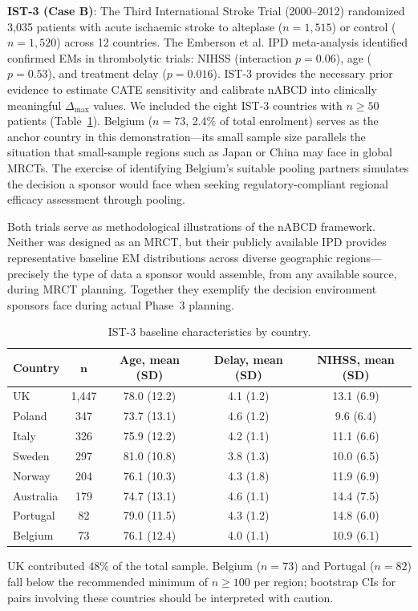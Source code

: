 \documentclass[AMA,Times1COL]{WileyNJDv5}
\begin{document}
\noindent
\textbf{IST-3 (Case B)}: The Third International Stroke Trial (2000--2012) randomized 3{,}035 patients with acute ischaemic stroke to alteplase ($n = 1{,}515$) or control ($n = 1{,}520$) across 12 countries.\cite{ist3_2012} The Emberson et al.\cite{emberson2014} IPD meta-analysis identified confirmed EMs in thrombolytic trials: NIHSS (interaction $p = 0.06$), age ($p = 0.53$), and treatment delay ($p = 0.016$). IST-3 provides the necessary prior evidence to estimate CATE sensitivity and calibrate nABCD into clinically meaningful $\Delta_{\max}$ values. We included the eight IST-3 countries with $n \geq 50$ patients (Table~\ref{tab:ist3_baseline}). Belgium ($n = 73$, 2.4\% of total enrolment) serves as the anchor country in this demonstration---its small sample size parallels the situation that small-sample regions such as Japan or China may face in global MRCTs. The exercise of identifying Belgium's suitable pooling partners simulates the decision a sponsor would face when seeking regulatory-compliant regional efficacy assessment through pooling.

Both trials serve as methodological illustrations of the nABCD framework. Neither was designed as an MRCT, but their publicly available IPD provides representative baseline EM distributions across diverse geographic regions---precisely the type of data a sponsor would assemble, from any available source, during MRCT planning. Together they exemplify the decision environment sponsors face during actual Phase~3 planning.

\begin{table}[ht]
\caption{IST-3 baseline characteristics by country.\label{tab:ist3_baseline}}
\begin{tabular*}{\textwidth}{@{\extracolsep\fill}lcccc@{}}
\toprule
\textbf{Country} & $\boldsymbol{n}$ & \textbf{Age, mean (SD)} & \textbf{Delay, mean (SD)} & \textbf{NIHSS, mean (SD)} \\
\midrule
UK & 1{,}447 & 78.0 (12.2) & 4.1 (1.2) & 13.1 (6.9) \\
Poland & 347 & 73.7 (13.1) & 4.6 (1.2) & 9.6 (6.4) \\
Italy & 326 & 75.9 (12.2) & 4.2 (1.1) & 11.1 (6.6) \\
Sweden & 297 & 81.0 (10.8) & 3.8 (1.3) & 10.0 (6.5) \\
Norway & 204 & 76.1 (10.3) & 4.3 (1.8) & 11.9 (6.9) \\
Australia & 179 & 74.7 (13.1) & 4.6 (1.1) & 14.4 (7.5) \\
Portugal & 82 & 79.0 (11.5) & 4.3 (1.2) & 14.8 (6.0) \\
Belgium & 73 & 76.1 (12.4) & 4.0 (1.1) & 10.9 (6.1) \\
\bottomrule
\end{tabular*}
\begin{tablenotes}
\item UK contributed 48\% of the total sample. Belgium ($n = 73$) and Portugal ($n = 82$) fall below the recommended minimum of $n \geq 100$ per region; bootstrap CIs for pairs involving these countries should be interpreted with caution.
\end{tablenotes}
\end{table}
\end{document}
